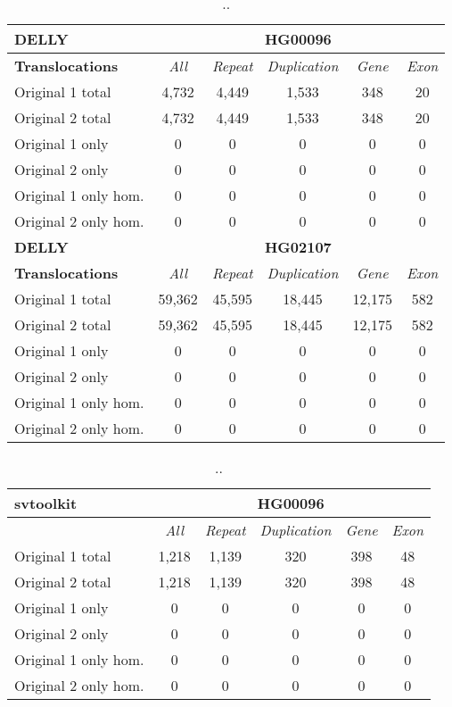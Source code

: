 \begin{table}[htb]
\caption{ .. }
\begin{center}
\begin{tabular}{|l|c||c|c|c|c|}
\hline
{\bf DELLY} & \multicolumn{5}{|c|}{\bf HG00096} \\
\hline
\cline{2-6}
{\bf Translocations} & {\it All} & {\it Repeat} & {\it Duplication} & {\it Gene} & {\it Exon} \\
\hline
Original 1 total & 4,732 & 4,449 & 1,533 & 348 & 20\\ 
\hline
Original 2 total & 4,732 & 4,449 & 1,533 & 348 & 20\\ 
\hline
Original 1 only & 0 & 0 & 0 & 0 & 0\\ 
\hline
Original 2 only & 0 & 0 & 0 & 0 & 0\\ 
\hline
Original 1 only hom. & 0 & 0 & 0 & 0 & 0\\ 
\hline
Original 2 only hom. & 0 & 0 & 0 & 0 & 0\\ 
\hline
\hline
{\bf DELLY} & \multicolumn{5}{|c|}{\bf HG02107} \\
\hline
\cline{2-6}
{\bf Translocations} & {\it All} & {\it Repeat} & {\it Duplication} & {\it Gene} & {\it Exon} \\
\hline
Original 1 total & 59,362 & 45,595 & 18,445 & 12,175 & 582 \\
\hline
Original 2 total & 59,362 & 45,595 & 18,445 & 12,175 & 582 \\
\hline
Original 1 only & 0 & 0 & 0 & 0 & 0\\ 
\hline
Original 2 only & 0 & 0 & 0 & 0 & 0\\ 
\hline
Original 1 only hom. & 0 & 0 & 0 & 0 & 0\\ 
\hline
Original 2 only hom. & 0 & 0 & 0 & 0 & 0\\ 
\hline
\end{tabular}
\end{center}
\label{tab:orig-vs-orig2-delly-trans}
\end{table}

\begin{table}[htb]
\caption{ .. }
\begin{center}
\begin{tabular}{|l|c||c|c|c|c|}
\hline
{\bf svtoolkit} & \multicolumn{5}{|c|}{\bf HG00096} \\
\hline
\cline{2-6}
{\bf} & {\it All} & {\it Repeat} & {\it Duplication} & {\it Gene} & {\it Exon} \\
\hline
Original 1 total & 1,218 & 1,139 & 320 & 398 & 48 \\
\hline
Original 2 total & 1,218 & 1,139 & 320 & 398 & 48 \\
\hline
Original 1 only & 0 & 0 & 0 & 0 & 0\\ 
\hline
Original 2 only & 0 & 0 & 0 & 0 & 0\\
\hline
Original 1 only hom. & 0 & 0 & 0 & 0 & 0\\ 
\hline
Original 2 only hom. & 0 & 0 & 0 & 0 & 0\\  
\hline
\end{tabular}
\end{center}
\label{tab:orig-vs-orig2-svtoolkit}
\end{table}

